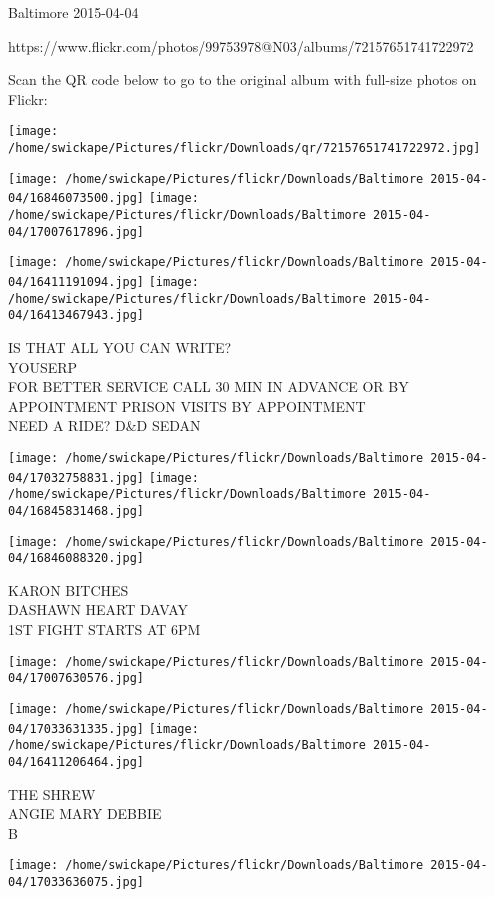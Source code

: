 \documentclass[10pt,letterpaper]{article}
\begin{document}
Baltimore 2015-04-04

https://www.flickr.com/photos/99753978@N03/albums/72157651741722972

Scan the QR code below to go to the original album with full-size photos on Flickr:

\texttt{[image: /home/swickape/Pictures/flickr/Downloads/qr/72157651741722972.jpg]}
\pagebreak

\texttt{[image: /home/swickape/Pictures/flickr/Downloads/Baltimore 2015-04-04/16846073500.jpg]}
\texttt{[image: /home/swickape/Pictures/flickr/Downloads/Baltimore 2015-04-04/17007617896.jpg]}

\texttt{[image: /home/swickape/Pictures/flickr/Downloads/Baltimore 2015-04-04/16411191094.jpg]}
\texttt{[image: /home/swickape/Pictures/flickr/Downloads/Baltimore 2015-04-04/16413467943.jpg]}

IS THAT ALL YOU CAN WRITE?\\
YOUSERP\\
FOR BETTER SERVICE CALL 30 MIN IN ADVANCE OR BY APPOINTMENT PRISON VISITS BY APPOINTMENT\\
NEED A RIDE?  D\&D SEDAN
\pagebreak

\texttt{[image: /home/swickape/Pictures/flickr/Downloads/Baltimore 2015-04-04/17032758831.jpg]}
\texttt{[image: /home/swickape/Pictures/flickr/Downloads/Baltimore 2015-04-04/16845831468.jpg]}

\texttt{[image: /home/swickape/Pictures/flickr/Downloads/Baltimore 2015-04-04/16846088320.jpg]}

KARON BITCHES\\
DASHAWN HEART DAVAY\\
1ST FIGHT STARTS AT 6PM
\pagebreak

\texttt{[image: /home/swickape/Pictures/flickr/Downloads/Baltimore 2015-04-04/17007630576.jpg]}

\vspace{0.25in}
\texttt{[image: /home/swickape/Pictures/flickr/Downloads/Baltimore 2015-04-04/17033631335.jpg]}
\texttt{[image: /home/swickape/Pictures/flickr/Downloads/Baltimore 2015-04-04/16411206464.jpg]}

THE SHREW\\
ANGIE MARY DEBBIE\\
B
\pagebreak

\texttt{[image: /home/swickape/Pictures/flickr/Downloads/Baltimore 2015-04-04/17033636075.jpg]}
\end{document}
